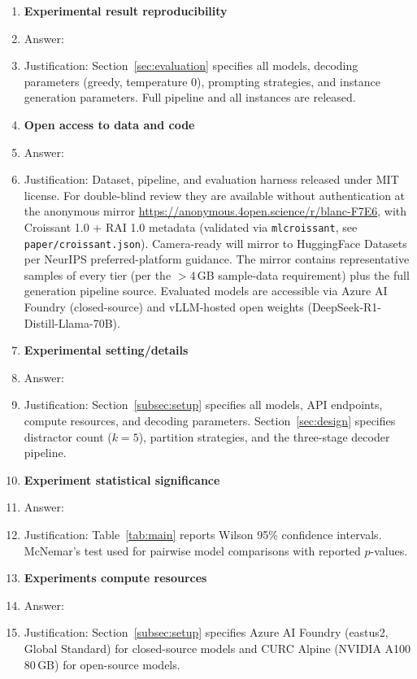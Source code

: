 \documentclass{article}
\theoremstyle{definition}
\begin{document}
\begin{enumerate}
\item {\bf Experimental result reproducibility}
    \item[] Answer: \answerYes{}
    \item[] Justification: Section~\ref{sec:evaluation} specifies all models, decoding parameters (greedy, temperature 0), prompting strategies, and instance generation parameters. Full pipeline and all instances are released.

\item {\bf Open access to data and code}
    \item[] Answer: \answerYes{}
    \item[] Justification: Dataset, pipeline, and evaluation harness released under MIT license. For double-blind review they are available without authentication at the anonymous mirror \url{https://anonymous.4open.science/r/blanc-F7E6}, with Croissant 1.0 + RAI 1.0 metadata (validated via \texttt{mlcroissant}, see \texttt{paper/croissant.json}). Camera-ready will mirror to HuggingFace Datasets per NeurIPS preferred-platform guidance. The mirror contains representative samples of every tier (per the $>$4\,GB sample-data requirement) plus the full generation pipeline source. Evaluated models are accessible via Azure AI Foundry (closed-source) and vLLM-hosted open weights (DeepSeek-R1-Distill-Llama-70B).

\item {\bf Experimental setting/details}
    \item[] Answer: \answerYes{}
    \item[] Justification: Section~\ref{subsec:setup} specifies all models, API endpoints, compute resources, and decoding parameters. Section~\ref{sec:design} specifies distractor count ($k = 5$), partition strategies, and the three-stage decoder pipeline.

\item {\bf Experiment statistical significance}
    \item[] Answer: \answerYes{}
    \item[] Justification: Table~\ref{tab:main} reports Wilson 95\% confidence intervals. McNemar's test used for pairwise model comparisons with reported $p$-values.

\item {\bf Experiments compute resources}
    \item[] Answer: \answerYes{}
    \item[] Justification: Section~\ref{subsec:setup} specifies Azure AI Foundry (eastus2, Global Standard) for closed-source models and CURC Alpine (NVIDIA A100 80\,GB) for open-source models.


\end{enumerate}
\end{document}
